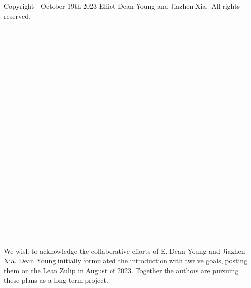 \documentclass{book}
\theoremstyle{definition}
\begin{document}
\thispagestyle{empty}


\newpage


\begin{center}

\pagecolor{white}
\color{black}




\end{center}

\thispagestyle{empty}




\newpage
\pagecolor{white}
\color{black}
\ \\
\ \\
\thispagestyle{empty}
\begin{center}
Copyright\ \textcopyright \ October 19th 2023 Elliot Dean Young and Jiazhen Xia.\ All rights reserved.\\
\end{center}
\large %
\newpage 
\ \\
\ \\
\ \\
\ \\
\ \\
\ \\
\ \\
\ \\
\ \\
\ \\
\ \\
\thispagestyle{empty}
 
\newpage

\ \\
\ \\
\ \\
\ \\
\ \\
\ \\
\ \\
\ \\
\ \\
\ \\
\ \\

We wish to acknowledge the collaborative efforts of E. Dean Young and Jiazhen Xia. Dean Young initially formulated the introduction with twelve goals, posting them on the Lean Zulip in August of 2023. Together the authors are pursuing these plans as a long term project.\\



\newpage
\end{document}
